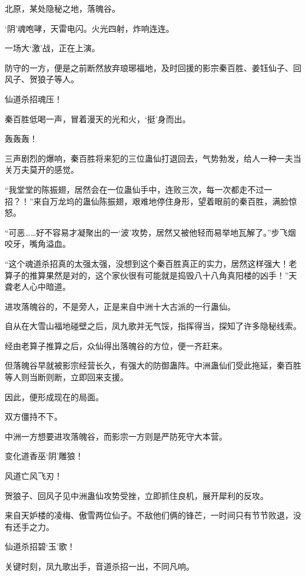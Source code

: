 
\begin{this_body}



北原，某处隐秘之地，落魄谷。

‘阴’魂咆哮，天雷电闪。火光四射，炸响连连。

一场大‘激’战，正在上演。

防守的一方，便是之前断然放弃琅琊福地，及时回援的影宗秦百胜、姜钰仙子、回风子、贺狼子等人。

仙道杀招魂压！

秦百胜低喝一声，冒着漫天的光和火，‘挺’身而出。

轰轰轰！

三声剧烈的爆响，秦百胜将来犯的三位蛊仙打退回去，气势勃发，给人一种一夫当关万夫莫开的感觉。

“我堂堂的陈振翅，居然会在一位蛊仙手中，连败三次，每一次都走不过一招？！”来自万龙坞的蛊仙陈振翅，艰难地停住身形，望着眼前的秦百胜，满脸惊怒。

“可恶……好不容易才凝聚出的一‘波’攻势，居然又被他轻而易举地瓦解了。”步飞烟咬牙，嘴角溢血。

“这个魂道杀招真的太强太强，没想到这个秦百胜真正的实力，居然这样强大！老算子的推算果然是对的，这个家伙很有可能就是捣毁八十八角真阳楼的凶手！”天聋老人心中暗道。

进攻落魄谷的，不是旁人，正是来自中洲十大古派的一行蛊仙。

自从在大雪山福地碰壁之后，凤九歌并无气馁，指挥得当，探知了许多隐秘线索。

经由老算子推算之后，众仙得出落魄谷的方位，便一齐赶来。

但落魄谷早就被影宗经营长久，有强大的防御蛊阵。中洲蛊仙们受此拖延，秦百胜等人则当断则断，立即回来支援。

因此，便形成现在的局面。

双方僵持不下。

中洲一方想要进攻落魄谷，而影宗一方则是严防死守大本营。

变化道香巫‘阴’雕狼！

风道亡风飞刃！

贺狼子、回风子见中洲蛊仙攻势受挫，立即抓住良机，展开犀利的反攻。

来自天妒楼的凌梅、傲雪两位仙子。不敌他们俩的锋芒，一时间只有节节败退，没有还手之力。

仙道杀招碧‘玉’歌！

关键时刻，凤九歌出手，音道杀招一出，不同凡响。


\end{this_body}
